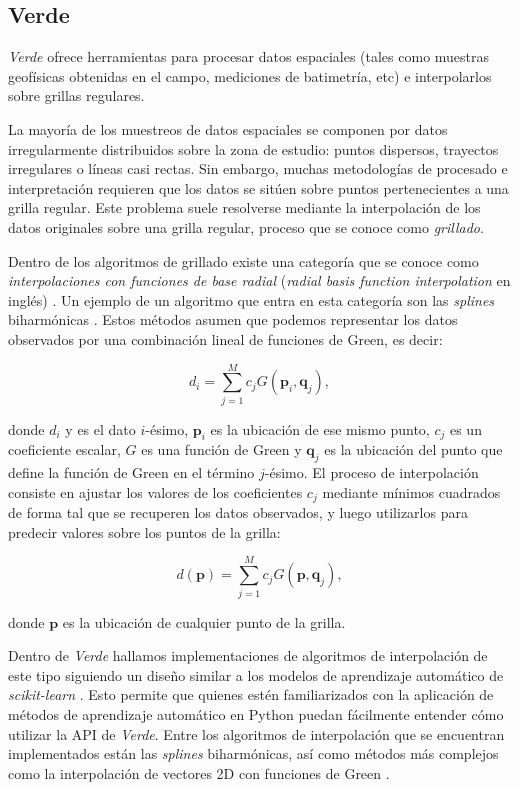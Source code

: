 \subsection{Verde}

\emph{Verde} ofrece herramientas para procesar datos espaciales (tales como
muestras geofísicas obtenidas en el campo, mediciones de batimetría, etc)
e interpolarlos sobre grillas regulares.

La mayoría de los muestreos de datos espaciales se componen por datos
irregularmente distribuidos sobre la zona de estudio:
puntos dispersos, trayectos irregulares o líneas casi rectas.
Sin embargo, muchas metodologías de procesado e interpretación requieren que
los datos se sitúen sobre puntos pertenecientes a una grilla regular.
Este problema suele resolverse mediante la interpolación de los datos
originales sobre una grilla regular, proceso que se conoce como
\emph{grillado}.

Dentro de los algoritmos de grillado existe una categoría que se conoce como
\emph{interpolaciones con funciones de base radial} (\emph{radial basis
function interpolation} en inglés) \citep{franke1982}.
Un ejemplo de un algoritmo que entra en esta categoría son las \emph{splines}
biharmónicas \citep{sandwell1987}.
Estos métodos asumen que podemos representar los datos observados por una
combinación lineal de funciones de Green, es decir:

\begin{equation}
    d_i = \sum_{j=1}^M c_j G(\mathbf{p}_i, \mathbf{q}_j),
\end{equation}

\noindent donde $d_i$ y es el dato $i$-ésimo, $\mathbf{p}_i$ es la ubicación de
ese mismo punto, $c_j$ es un coeficiente escalar, $G$ es una función de Green y
$\mathbf{q}_j$ es la ubicación del punto que define la función de Green en el
término $j$-ésimo.
El proceso de interpolación consiste en ajustar los valores de los
coeficientes $c_j$ mediante mínimos cuadrados de forma tal que se recuperen los
datos observados, y luego utilizarlos para predecir valores sobre los puntos de
la grilla:

\begin{equation}
    d(\mathbf{p}) = \sum_{j=1}^M c_j G(\mathbf{p}, \mathbf{q}_j),
\end{equation}

\noindent donde $\mathbf{p}$ es la ubicación de cualquier punto de la grilla.

Dentro de \emph{Verde} hallamos implementaciones de algoritmos de interpolación
de este tipo siguiendo un diseño similar
a los modelos de aprendizaje automático de \emph{scikit-learn}
\citep{sklearn2011}. Esto permite que quienes estén familiarizados con la
aplicación de métodos de aprendizaje automático en Python puedan fácilmente
entender cómo utilizar la \ac{API} de \emph{Verde}.
Entre los algoritmos de interpolación que se encuentran implementados están las
\emph{splines} biharmónicas, así como métodos más complejos como la
interpolación de vectores 2D con funciones de Green \citep{sandwell2016}.

